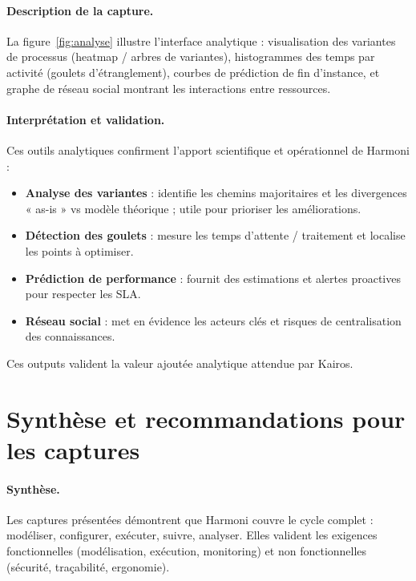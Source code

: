 \paragraph{Description de la capture.}  
La figure~\ref{fig:analyse} illustre l’interface analytique : visualisation des variantes de processus (heatmap / arbres de variantes), histogrammes des temps par activité (goulets d’étranglement), courbes de prédiction de fin d’instance, et graphe de réseau social montrant les interactions entre ressources.

\paragraph{Interprétation et validation.}  
Ces outils analytiques confirment l’apport scientifique et opérationnel de Harmoni :  
\begin{itemize}
    \item \textbf{Analyse des variantes} : identifie les chemins majoritaires et les divergences « as-is » vs modèle théorique ; utile pour prioriser les améliorations.
    \item \textbf{Détection des goulets} : mesure les temps d’attente / traitement et localise les points à optimiser.
    \item \textbf{Prédiction de performance} : fournit des estimations et alertes proactives pour respecter les SLA.
    \item \textbf{Réseau social} : met en évidence les acteurs clés et risques de centralisation des connaissances.
\end{itemize}
Ces outputs valident la valeur ajoutée analytique attendue par Kairos.

\section{Synthèse et recommandations pour les captures}

\paragraph{Synthèse.}  
Les captures présentées démontrent que Harmoni couvre le cycle complet : modéliser, configurer, exécuter, suivre, analyser. Elles valident les exigences fonctionnelles (modélisation, exécution, monitoring) et non fonctionnelles (sécurité, traçabilité, ergonomie).

